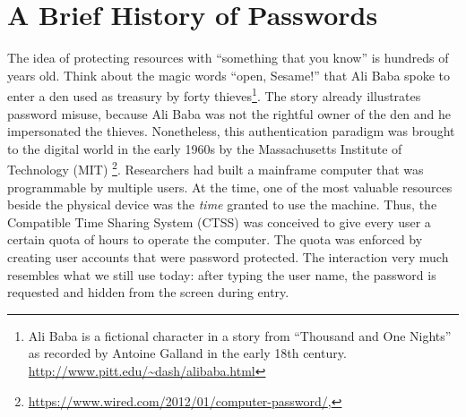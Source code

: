 \section{A Brief History of Passwords}
The idea of protecting resources with ``something that you know'' is hundreds of years old. Think about the magic words ``open, Sesame!'' that Ali Baba spoke to enter a den used as treasury by forty thieves\footnote{Ali Baba is a fictional character in a story from ``Thousand and One Nights'' as recorded by Antoine Galland in the early 18th century. \url{http://www.pitt.edu/~dash/alibaba.html} }. The story already illustrates password misuse, because Ali Baba was not the rightful owner of the den and he impersonated the thieves. Nonetheless, this authentication paradigm was brought to the digital world in the early 1960s by the Massachusetts Institute of Technology (MIT) \footnote{\url{https://www.wired.com/2012/01/computer-password/}, }. Researchers had built a mainframe computer that was programmable by multiple users. At the time, one of the most valuable resources beside the physical device was the \textit{time} granted to use the machine. Thus, the Compatible Time Sharing System (CTSS) was conceived to give every user a certain quota of hours to operate the computer. The quota was enforced by creating user accounts that were password protected. The interaction very much resembles what we still use today: after typing the user name, the password is requested and hidden from the screen during entry.


